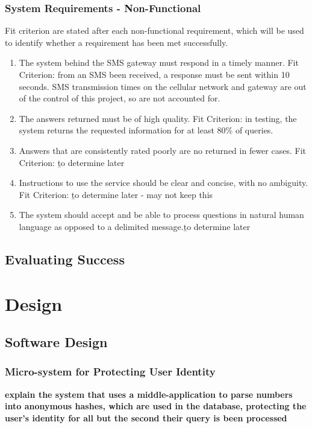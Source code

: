 \documentclass{article}
\begin{document}
\subsubsection{System Requirements - Non-Functional}
Fit criterion are stated after each non-functional requirement, which will be used to identify whether a requirement has been met successfully.
\begin{enumerate}
  \item The system behind the SMS gateway must respond in a timely manner.  Fit Criterion: from an SMS been received, a response must be sent within 10 seconds.  SMS transmission times on the cellular network and gateway are out of the control of this project, so are not accounted for.
  \item The answers returned must be of high quality.  Fit Criterion: in testing, the system returns the requested information for at least 80\% of queries.
  \item Answers that are consistently rated poorly are no returned in fewer cases.  Fit Criterion: {\b to determine later}%
  \item Instructions to use the service should be clear and concise, with no ambiguity.  Fit Criterion: {\b to determine later - may not keep this}%
  \item The system should accept and be able to process questions in natural human language as opposed to a delimited message.{\b to determine later}%
\end{enumerate}

\subsection{Evaluating Success}

\newpage
\section{Design}
\label{sec:design}

\subsection{Software Design}

\subsubsection{Micro-system for Protecting User Identity}
{\bf explain the system that uses a middle-application to parse numbers into anonymous hashes, which are used in the database, protecting the user's identity for all but the second their query is been processed}
\end{document}
